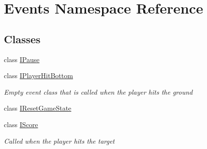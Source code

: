 \hypertarget{namespace_events}{}\section{Events Namespace Reference}
\label{namespace_events}
\subsection*{Classes}
\begin{DoxyCompactItemize}
\item 
class \hyperlink{class_events_1_1_i_pause}{I\+Pause}
\item 
class \hyperlink{class_events_1_1_i_player_hit_bottom}{I\+Player\+Hit\+Bottom}
\begin{DoxyCompactList}\small\item\em Empty event class that is called when the player hits the ground \end{DoxyCompactList}\item 
class \hyperlink{class_events_1_1_i_reset_game_state}{I\+Reset\+Game\+State}
\item 
class \hyperlink{class_events_1_1_i_score}{I\+Score}
\begin{DoxyCompactList}\small\item\em Called when the player hits the target \end{DoxyCompactList}\end{DoxyCompactItemize}
